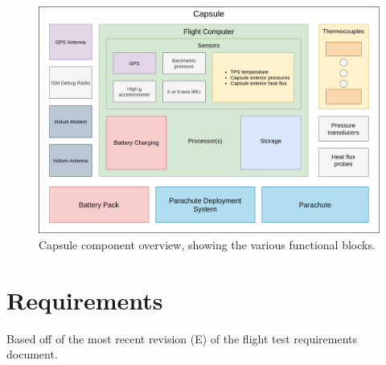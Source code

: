 \documentclass{article}
\newcommand{\ddrev}{E}
\begin{document}
\begin{figure}[h!]
	\centering
	\includegraphics[width=\textwidth]{images/amtps-avionics.png}
	\caption{Capsule component overview, showing the various functional blocks.}
	\label{fig:capsule-overview}
\end{figure}


\section{Requirements}
\label{sec:requirements}
Based off of the most recent revision (\ddrev) of the flight test requirements document.
\end{document}
